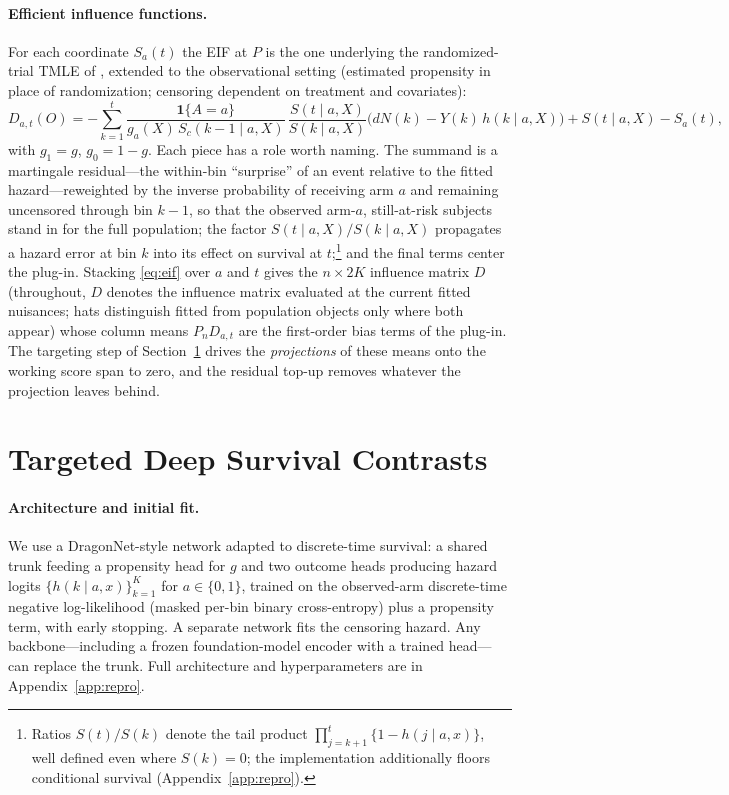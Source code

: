 \documentclass[11pt]{article}
\theoremstyle{remark}
\newcommand{\Pn}{P_n}
\newcommand{\ind}{\mathbf{1}}
\begin{document}
\paragraph{Efficient influence functions.} For each coordinate $S_a(t)$ the EIF at $P$ is the one underlying the randomized-trial TMLE of \citet{moore2009}, extended to the observational setting (estimated propensity in place of randomization; censoring dependent on treatment and covariates):
\begin{equation}\label{eq:eif}
D_{a,t}(O) = -\sum_{k=1}^{t} \frac{\ind\{A=a\}}{g_a(X)\, S_c(k-1\mid a, X)}\,\frac{S(t\mid a,X)}{S(k\mid a,X)}\big(dN(k) - Y(k)\, h(k\mid a,X)\big) + S(t\mid a,X) - S_a(t),
\end{equation}
with $g_1=g$, $g_0=1-g$. Each piece has a role worth naming. The summand is a martingale residual---the within-bin ``surprise'' of an event relative to the fitted hazard---reweighted by the inverse probability of receiving arm $a$ and remaining uncensored through bin $k-1$, so that the observed arm-$a$, still-at-risk subjects stand in for the full population; the factor $S(t\mid a,X)/S(k\mid a,X)$ propagates a hazard error at bin $k$ into its effect on survival at $t$;\footnote{Ratios $S(t)/S(k)$ denote the tail product $\prod_{j=k+1}^{t}\{1-h(j\mid a,x)\}$, well defined even where $S(k)=0$; the implementation additionally floors conditional survival (Appendix~\ref{app:repro}).} and the final terms center the plug-in. Stacking \eqref{eq:eif} over $a$ and $t$ gives the $n\times 2K$ influence matrix $D$ (throughout, $D$ denotes the influence matrix evaluated at the current fitted nuisances; hats distinguish fitted from population objects only where both appear) whose column means $\Pn D_{a,t}$ are the first-order bias terms of the plug-in. The targeting step of Section~\ref{sec:method} drives the \emph{projections} of these means onto the working score span to zero, and the residual top-up removes whatever the projection leaves behind.

\section{Targeted Deep Survival Contrasts}\label{sec:method}

\paragraph{Architecture and initial fit.} We use a DragonNet-style network \citep{shi2019dragonnet} adapted to discrete-time survival: a shared trunk feeding a propensity head for $g$ and two outcome heads producing hazard logits $\{h(k\mid a, x)\}_{k=1}^{K}$ for $a\in\{0,1\}$, trained on the observed-arm discrete-time negative log-likelihood (masked per-bin binary cross-entropy) plus a propensity term, with early stopping. A separate network fits the censoring hazard. Any backbone---including a frozen foundation-model encoder with a trained head---can replace the trunk. Full architecture and hyperparameters are in Appendix~\ref{app:repro}.
\end{document}
